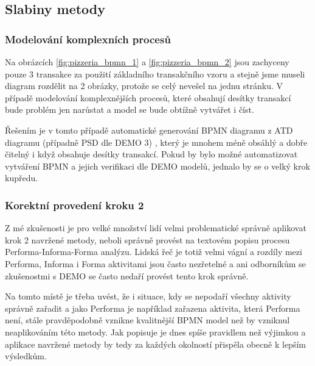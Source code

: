 \subsection{Slabiny metody}
\subsubsection{Modelování komplexních procesů}
Na obrázcích \ref{fig:pizzeria_bpmn_1} a \ref{fig:pizzeria_bpmn_2} jsou zachyceny pouze 3 transakce za použití základního transakčního vzoru a stejně jsme museli diagram rozdělit na 2 obrázky, protože se celý nevešel na jednu stránku. V případě modelování komplexnějších procesů, které obsahují desítky transakcí bude problém jen narůstat a model se bude obtížně vytvářet i číst.

Řešením je v tomto případě automatické generování BPMN diagramu z ATD diagramu (případně PSD dle DEMO 3) , který je mnohem méně obsáhlý a dobře čitelný i když obsahuje desítky transakcí. Pokud by bylo možné automatizovat vytváření BPMN a jejich verifikaci dle DEMO modelů, jednalo by se o velký krok kupředu.

\subsubsection{Korektní provedení kroku 2}
Z mé zkušenosti je pro velké množství lidí velmi problematické správně aplikovat krok 2 navržené metody, neboli správně provést na textovém popisu procesu Performa-Informa-Forma analýzu. Lidská řeč je totiž velmi vágní a rozdíly mezi Performa, Informa i Forma aktivitami jsou často nezřetelné a ani odborníkům se zkušenostmi s DEMO se často nedaří provést tento krok správně.

Na tomto místě je třeba uvést, že i situace, kdy se nepodaří všechny aktivity správně zařadit a jako Performa je například zařazena aktivita, která Performa není, stále pravděpodobně vznikne kvalitnější BPMN model než by vzniknul neaplikováním této metody. Jak popisuje \cite{Silver2011}  je dnes spíše pravidlem než výjimkou a aplikace navržené metody by tedy za každých okolností přispěla obecně k lepším výsledkům.